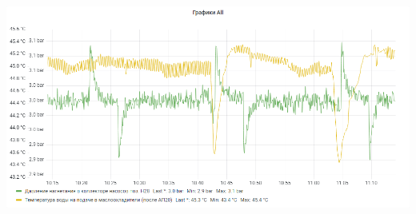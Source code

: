 \documentclass{article}
\begin{document}
\begin{center}
\par
\vspace{0.5cm}
\par
\vspace{0.5cm}
\includegraphics[width=\textwidth]{image156}
\par
\vspace{0.5cm}


\end{center}
\end{document}
